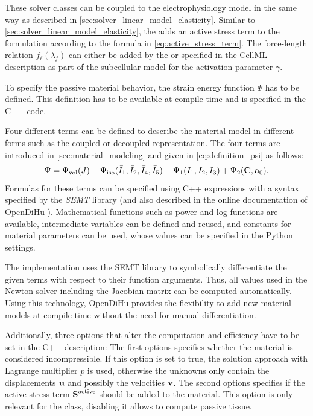 These solver classes can be coupled to the electrophysiology model in the same way as described in \cref{sec:solver_linear_model_elasticity}.
Similar to \cref{sec:solver_linear_model_elasticity}, the  adds an active stress term to the formulation according to the formula in \cref{eq:active_stress_term}. The force-length relation $f_\ell(\lambda_f)$ can either be added by the   or specified in the CellML description as part of the subcellular model for the activation parameter $\gamma$.

To specify the passive material behavior, the strain energy function $\Psi$ has to be defined.
This definition has to be available at compile-time and is specified in the C++ code. 

Four different terms can be defined to describe the material model in different forms such as the coupled or decoupled representation. The four terms are introduced in \cref{sec:material_modeling} and given in \cref{eq:definition_psi} as follows:
\begin{align}\label{eq:definition_psi1}
  \Psi = \Psi_\text{vol}(J) + \Psi_\text{iso}(\bar{I}_1,\bar{I}_2,\bar{I}_4,\bar{I}_5) + \Psi_1(I_1,I_2,I_3) + \Psi_2(\textbf{C},\textbf{a}_0).
\end{align}
Formulas for these terms can be specified using C++ expressions with a syntax specified by the \emph{SEMT} library \cite{semt,gutterman2004symbolic} (and also described in the online documentation of OpenDiHu \cite{opendihuWeb}). Mathematical functions such as power and log functions are available, intermediate variables can be defined and reused, and constants for material parameters can be used, whose values can be specified in the Python settings.

The implementation uses the SEMT library to symbolically differentiate the given terms with respect to their function arguments. Thus, all values used in the Newton solver including the Jacobian matrix can be computed automatically. Using this technology, OpenDiHu provides the flexibility to add new material models at compile-time without the need for manual differentiation.

Additionally, three options that alter the computation and efficiency have to be set in the C++ description: The first options specifies whether the material is considered incompressible. If this option is set to true, the solution approach with Lagrange multiplier $p$ is used, otherwise the unknowns only contain the displacements $\textbf{u}$ and possibly the velocities $\textbf{v}$. The second options specifies if the active stress term $\textbf{S}^\text{active}$ should be added to the material. This option is only relevant for the  class, disabling it allows to compute passive tissue.

